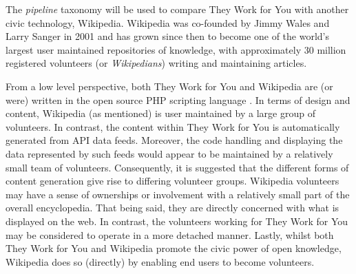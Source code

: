 The \emph{pipeline} taxonomy will be used to compare They Work for You with another civic technology, Wikipedia.
Wikipedia was co-founded by Jimmy Wales \cite{jimmy-wales} and Larry Sanger \cite{larry-sanger} in 2001 and has grown since then to become one of the world's largest user maintained repositories of knowledge, with approximately 30 million registered volunteers (or \emph{Wikipedians}) writing and maintaining articles.

From a low level perspective, both They Work for You and Wikipedia are (or were) written in the open source PHP scripting language \cite{php}.
In terms of design and content, Wikipedia (as mentioned) is user maintained by a large group of volunteers.
In contrast, the content within They Work for You is automatically generated from API data feeds.
Moreover, the code handling and displaying the data represented by such feeds would appear to be maintained by a relatively small team of volunteers.
Consequently, it is suggested that the different forms of content generation give rise to differing volunteer groups. Wikipedia volunteers may have a sense of ownerships or involvement with a relatively small part of the overall encyclopedia.  That being said, they are directly concerned with what is displayed on the web. In contrast, the volunteers working for They Work for You may be considered to operate in a more detached manner. 
Lastly, whilst both They Work for You and Wikipedia promote the civic power of open knowledge, Wikipedia does so (directly) by enabling end users to become volunteers. 
